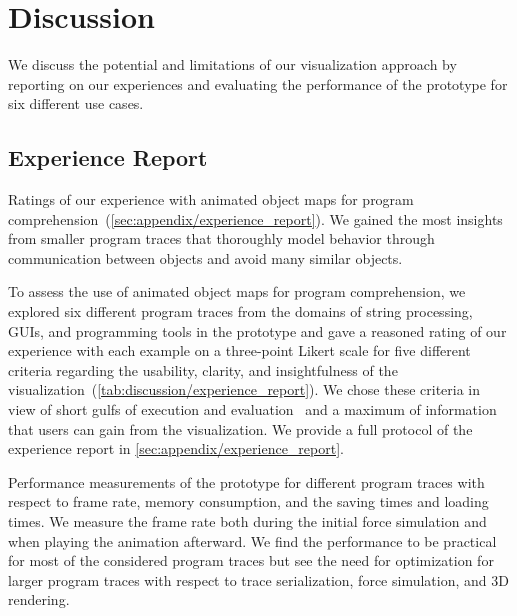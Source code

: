 \section{Discussion}
\label{sec:discussion}

We discuss the potential and limitations of our visualization approach by reporting on our experiences and evaluating the performance of the \tfd{} prototype for six different use cases.

\subsection{Experience Report}
\label{sec:discussion/experience_report}

\begin{table}[b!]
	\centering
	\caption{
		Ratings of our experience with animated object maps for program comprehension~(\cref{sec:appendix/experience_report}).
		We gained the most insights from smaller program traces that thoroughly model behavior through communication between objects and avoid many similar objects.
	}
	\label{tab:discussion/experience_report}
	\begin{threeparttable}
		\centering
		{\footnotesize
		}
	\end{threeparttable}
\end{table}

To assess the use of animated object maps for program comprehension, we explored six different program traces from the domains of string processing, GUIs, and programming tools in the \tfd{} prototype and gave a reasoned rating of our experience with each example on a three-point Likert scale for five different criteria regarding the usability, clarity, and insightfulness of the visualization~(\cref{tab:discussion/experience_report}).
We chose these criteria in view of short gulfs of execution and evaluation~\cite{norman1986cognitive} and a maximum of information that users can gain from the visualization.
We provide a full protocol of the experience report in \cref{sec:appendix/experience_report}.

\begin{table*}[bp]
	\centering
	\caption{
		Performance measurements of the \tfd{} prototype for different program traces with respect to frame rate, memory consumption, and the saving times and loading times.
		We measure the frame rate both during the initial force simulation and when playing the animation afterward.
		We find the performance to be practical for most of the considered program traces but see the need for optimization for larger program traces with respect to trace serialization, force simulation, and 3D rendering.
	}
	\label{tab:discussion/performance}
	\begin{threeparttable}
		\centering
		{\footnotesize
		}
	\end{threeparttable}
\end{table*}

